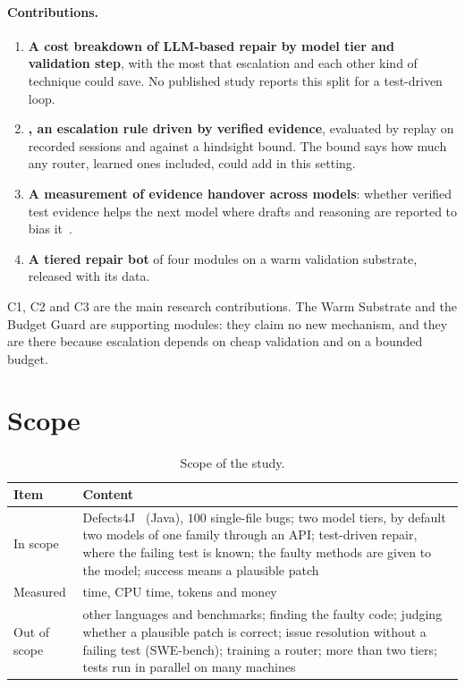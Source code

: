 \paragraph{Contributions.}
\begin{enumerate}[label=\textbf{C\arabic*}]
\item \textbf{A cost breakdown of LLM-based repair by model tier and
validation step}, with the most that escalation and each other kind of
technique could save. No published study reports this split for a test-driven
loop.
\item \textbf{\Step, an escalation rule driven by verified evidence},
evaluated by replay on recorded sessions and against a hindsight bound. The
bound says how much any router, learned ones included, could add in this
setting.
\item \textbf{A measurement of evidence handover across models}: whether
verified test evidence helps the next model where drafts and reasoning are
reported to bias it~\citep{son2026swerouter,ning2026revision}.
\item \textbf{A tiered repair bot} of four modules on a warm validation
substrate, released with its data.
\end{enumerate}
C1, C2 and C3 are the main research contributions. The Warm Substrate and the
Budget Guard are supporting modules: they claim no new mechanism, and they are
there because escalation depends on cheap validation and on a bounded budget.

\section{Scope}
\label{sec:intro-scope}

\begin{table}[htbp]
\centering
\caption{Scope of the study.}
\label{tab:intro-scope}
\footnotesize
\begin{tabularx}{\textwidth}{@{}>{\raggedright\arraybackslash}p{} >{\raggedright\arraybackslash}X@{}}
\toprule
Item & Content\\
\midrule
In scope & Defects4J~\citep{just2014defects4j} (Java), $100$ single-file bugs; two model tiers, by default two models of one family through an API; test-driven repair, where the failing test is known; the faulty methods are given to the model; success means a plausible patch\\
Measured & time, CPU time, tokens and money\\
Out of scope & other languages and benchmarks; finding the faulty code; judging whether a plausible patch is correct; issue resolution without a failing test (SWE-bench); training a router; more than two tiers; tests run in parallel on many machines\\
\bottomrule
\end{tabularx}
\end{table}

